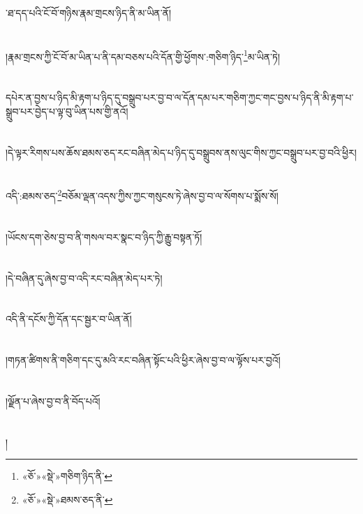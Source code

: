 ་ཐ་དད་པའི་ངོ་བོ་གཉིས་རྣམ་གྲངས་ཉིད་ནི་མ་ཡིན་ནོ།\chapter{ }།རྣམ་གྲངས་ཀྱི་ངོ་བོ་མ་ཡིན་པ་ནི་དམ་བཅས་པའི་དོན་གྱི་ཕྱོགས་:གཅིག་ཉིད་\footnote{«ཅོ་»«སྡེ་»གཅིག་ཉིད་ནི་}མ་ཡིན་ཏེ།\chapter{ }དཔེར་ན་བྱས་པ་ཉིད་མི་རྟག་པ་ཉིད་དུ་བསྒྲུབ་པར་བྱ་བ་ལ་དོན་དམ་པར་གཅིག་ཀྱང་གང་བྱས་པ་ཉིད་ནི་མི་རྟག་པ་སྒྲུབ་པར་བྱེད་པ་ལྟ་བུ་ཡིན་པས་གྱི་ནའོ།\chapter{ }།དེ་ལྟར་རིགས་པས་ཆོས་ཐམས་ཅད་རང་བཞིན་མེད་པ་ཉིད་དུ་བསྒྲུབས་ནས་ལུང་གིས་ཀྱང་བསྒྲུབ་པར་བྱ་བའི་ཕྱིར།\chapter{ }འདི་:ཐམས་ཅད་\footnote{«ཅོ་»«སྡེ་»ཐམས་ཅད་ནི་}བཅོམ་ལྡན་འདས་ཀྱིས་ཀྱང་གསུངས་ཏེ་ཞེས་བྱ་བ་ལ་སོགས་པ་སྨོས་སོ།\chapter{ }།ཡོངས་དག་ཅེས་བྱ་བ་ནི་གསལ་བར་སྣང་བ་ཉིད་ཀྱི་རྒྱུ་བསྟན་ཏོ།\chapter{ }།དེ་བཞིན་དུ་ཞེས་བྱ་བ་འདི་རང་བཞིན་མེད་པར་ཏེ།\chapter{ }འདི་ནི་དངོས་ཀྱི་དོན་དང་སྦྱར་བ་ཡིན་ནོ།\chapter{ }།གཏན་ཚིགས་ནི་གཅིག་དང་དུ་མའི་རང་བཞིན་སྟོང་པའི་ཕྱིར་ཞེས་བྱ་བ་ལ་ལྟོས་པར་བྱའོ།\chapter{ }།ལྗོན་པ་ཞེས་བྱ་བ་ནི་བོད་པའོ།\chapter{ }།
